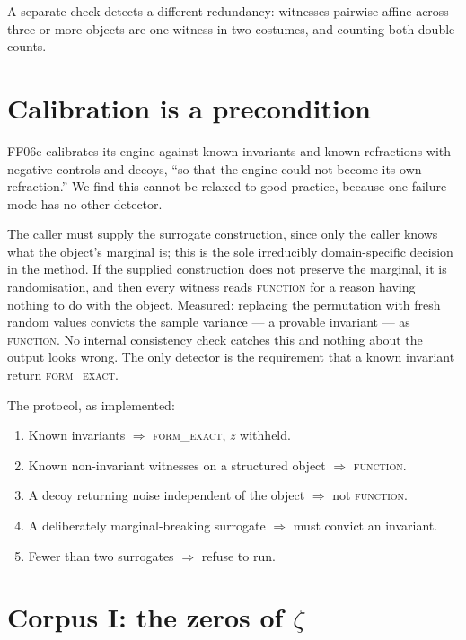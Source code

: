 \documentclass[11pt]{article}
\theoremstyle{remark}
\newcommand{\tier}[1]{\textsc{#1}}
\begin{document}
A separate check detects a different redundancy: witnesses pairwise affine across three
or more objects are one witness in two costumes, and counting both double-counts.

\section{Calibration is a precondition}\label{sec:calib}

FF06e calibrates its engine against known invariants and known refractions with negative
controls and decoys, ``so that the engine could not become its own refraction.'' We find
this cannot be relaxed to good practice, because one failure mode has no other detector.

The caller must supply the surrogate construction, since only the caller knows what the
object's marginal is; this is the sole irreducibly domain-specific decision in the method.
If the supplied construction does not preserve the marginal, it is randomisation, and then
every witness reads \tier{function} for a reason having nothing to do with the object.
Measured: replacing the permutation with fresh random values convicts the sample variance
--- a provable invariant --- as \tier{function}. No internal consistency check catches
this and nothing about the output looks wrong. The only detector is the requirement that a
known invariant return \tier{form\_exact}.

The protocol, as implemented:
\begin{enumerate}[leftmargin=2em,itemsep=1pt]
\item Known invariants $\Rightarrow$ \tier{form\_exact}, $z$ withheld.
\item Known non-invariant witnesses on a structured object $\Rightarrow$ \tier{function}.
\item A decoy returning noise independent of the object $\Rightarrow$ not \tier{function}.
\item A deliberately marginal-breaking surrogate $\Rightarrow$ must convict an invariant.
\item Fewer than two surrogates $\Rightarrow$ refuse to run.
\end{enumerate}

\section{Corpus I: the zeros of $\zeta$}\label{sec:zeros}
\end{document}

